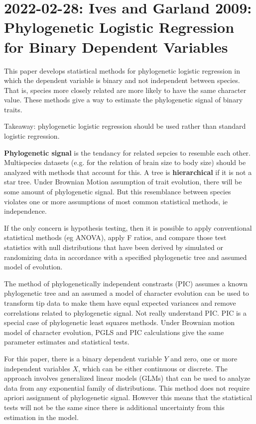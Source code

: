 \documentclass{article}
\newcommand{\bnote}[1]{{\blue #1 }} %
\begin{document}
\section{2022-02-28: Ives and Garland 2009: Phylogenetic Logistic Regression for
Binary Dependent Variables}

This paper develops statistical methods for phylogenetic logistic regression in
which the dependent variable is binary and not independent between species. That
is, species more closely related are more likely to have the same character
value. These methods give a way to estimate the phylogenetic signal of binary
traits.

Takeaway: phylogenetic logistic regression should be used rather than standard
logistic regression.


\textbf{Phylogenetic signal} is the tendancy for related sepcies to resemble
each other. Multispecies datasets (e.g. for the relation of brain size to body
size) should be analyzed with methods that account for this. A tree is
\textbf{hierarchical} if it is not a star tree. Under Brownian Motion assumption
of trait evolution, there will be some amount of phylogenetic signal. But this
resemblance between species violates one or more assumptions of most common
statistical methods, ie independence.

If the only concern is hypothesis testing, then it is possible to apply
conventional statistical methods (eg ANOVA), apply F ratios, and compare those
test statistics with null distributions that have been derived by simulated or
randomizing data in accordance with a specified phylogenetic tree and assumed
model of evolution.

The method of phylogenetically independent constrasts (PIC) assumes a known
phylogenetic tree and an assumed a model of character evolution can be used to
transform tip data to make them have equal expected variances and remove
correlations related to phylogenetic signal. \bnote{Not really understand PIC.}
PIC is a special case of phylogenetic least squares methods. Under Brownian
motion model of character evolution, PGLS and PIC calculations give the same
parameter estimates and statistical tests.

For this paper, there is a binary dependent variable $Y$ and zero, one or more
independent variables $X$, which can be either continuous or discrete. The
approach involves generalized linear models (GLMs) that can be used to analyze
data from any exponential family of distributions. This method does not require
apriori assignment of phylogenetic signal. However this means that the 
statistical tests will not be the same since there is additional uncertainty
from this estimation in the model.  
\end{document}

